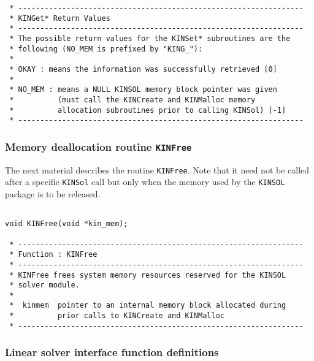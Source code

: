 \documentclass[11pt]{article}
\begin{document}
\begin{verbatim}
 * -----------------------------------------------------------------
 * KINGet* Return Values
 * -----------------------------------------------------------------
 * The possible return values for the KINSet* subroutines are the
 * following (NO_MEM is prefixed by "KING_"):
 *
 * OKAY : means the information was successfully retrieved [0]
 * 
 * NO_MEM : means a NULL KINSOL memory block pointer was given
 *          (must call the KINCreate and KINMalloc memory
 *          allocation subroutines prior to calling KINSol) [-1]
 * -----------------------------------------------------------------

\end{verbatim}
\normalsize

\subsubsection{Memory deallocation routine {\tt KINFree}}

The next material describes the routine {\tt KINFree}. Note that it need
not be called after a specific {\tt KINSol} call but only when the
memory used by the {\tt KINSOL} package is to be released.
\small
\begin{verbatim}

void KINFree(void *kin_mem);
 
 * -----------------------------------------------------------------
 * Function : KINFree
 * -----------------------------------------------------------------
 * KINFree frees system memory resources reserved for the KINSOL
 * solver module.
 *
 *  kinmem  pointer to an internal memory block allocated during
 *          prior calls to KINCreate and KINMalloc
 * -----------------------------------------------------------------

\end{verbatim}
\normalsize 

\subsubsection{Linear solver interface function definitions}
\end{document}
